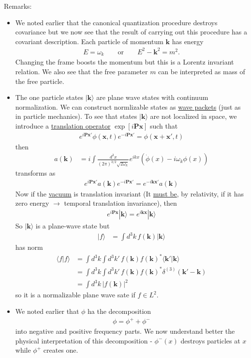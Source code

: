 \documentclass{article}
\begin{document}
Remarks:
\begin{itemize}
\item We noted earlier that the canonical quantization procedure destroys covariance but we now see that the result of carrying out this procedure has a covariant description. Each particle of momentum $\mathbf{k}$ has energy
\begin{align}
E=\omega_k\qquad\text{or}\qquad E^2-\mathbf{k}^2=m^2.
\end{align}
Changing the frame boosts the momentum but this is a Lorentz invariant relation. We also see that the free parameter $m$ can be interpreted as mass of the free particle.

\item The one particle states $|\mathbf{k}\rangle$ are plane wave states with continuum normalization. We can construct normlizable states as \underline{wave packets} (just as in particle mechanics). To see that states $|\mathbf{k}\rangle$ are not localized in space, we introduce a \underline{translation operator} $\exp[i\mathbf{Px}]$ such that
\begin{align}
e^{i\mathbf{Px}'}\phi(\mathbf{x},t)e^{-i\mathbf{Px}'}=\phi(\mathbf{x}+\mathbf{x}',t)
\end{align}
then
\begin{align}
a(\mathbf{k})
&=i\int\frac{d^3x}{(2\pi)^{3/2}\sqrt{2\omega_k}}e^{ikx}(\dot{\phi}(x)-i\omega_k\phi(x))
\end{align}
transforms as
\begin{align}
e^{i\mathbf{Px}'}a(\mathbf{k})e^{-i\mathbf{Px}'}=e^{-i\mathbf{kx}'}a(\mathbf{k})
\end{align}
Now if the \underline{vacuum} is translation invariant (It \underline{must be}, by relativity, if it has zero energy $\rightarrow$ temporal translation invariance), then
\begin{align}
e^{i\mathbf{Px}}|\mathbf{k}\rangle=e^{i\mathbf{kx}}|\mathbf{k}\rangle
\end{align}
So $|\mathbf{k}\rangle$ is a plane-wave state but
\begin{align}
|f\rangle&=\int d^3k\,f(\mathbf{k})|\mathbf{k}\rangle
\end{align}
has norm
\begin{align}
\langle f|f\rangle
&=\int d^3k\int d^3k'\,f(\mathbf{k})f(\mathbf{k})^*\langle\mathbf{k}'|\mathbf{k}\rangle\\
&=\int d^3k\int d^3k'\,f(\mathbf{k})f(\mathbf{k})^*\delta^{(3)}(\mathbf{k}'-\mathbf{k})\\
&=\int d^3k\,|f(\mathbf{k})|^2
\end{align}
so it is a normalizable plane wave sate if $f\in L^2$. 

\item We noted earlier that $\phi$ ha the decomposition
\begin{align}
\phi=\phi^++\phi^-
\end{align}
into negative and positive frequency parts. We now understand better the physical interpretation of this decomposition - $\phi^-(x)$ destroys particles at $x$ while $\phi^+$ creates one.
\end{itemize}
\end{document}
